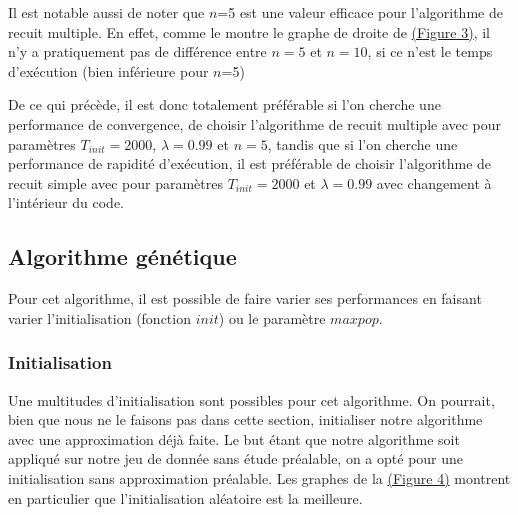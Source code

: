 \documentclass[11pt,french]{report}
\begin{document}
        Il est notable aussi de noter que $n$=5 est une valeur efficace pour l'algorithme de recuit multiple. En effet, comme le montre le graphe de droite de \hyperref[Figure3]{(Figure 3)}, il n'y a pratiquement pas de différence entre $n=5$ et $n=10$, si ce n'est le temps d'exécution (bien inférieure pour $n$=5)


        De ce qui précède, il est donc totalement préférable si l'on cherche une performance de convergence, de choisir l'algorithme de recuit multiple avec pour paramètres $T_{init} = 2000$,  $\lambda = 0.99$ et $n=5$, tandis que si l'on cherche une performance de rapidité d'exécution, il est préférable de choisir l'algorithme de recuit simple avec pour paramètres $T_{init} = 2000$ et $\lambda = 0.99$ avec changement à l'intérieur du code.


        \subsection{Algorithme génétique}
        Pour cet algorithme, il est possible de faire varier ses performances en faisant varier l'initialisation (fonction $init$) ou le paramètre $maxpop$.

        \subsubsection{Initialisation}
        
        Une multitudes d'initialisation sont possibles pour cet algorithme. On pourrait, bien que nous ne le faisons pas dans cette section, initialiser notre algorithme avec une approximation déjà faite. Le but étant que notre algorithme soit appliqué sur notre jeu de donnée sans étude préalable, on a opté pour une initialisation sans approximation préalable. Les graphes de la \hyperref[Figure4]{(Figure 4)} montrent en particulier que l'initialisation aléatoire est la meilleure.
\end{document}
